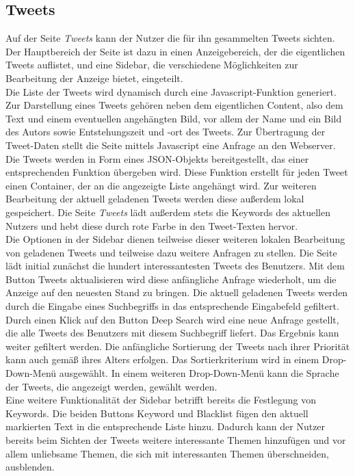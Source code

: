 \subsection{Tweets}
Auf der Seite \textit{Tweets} kann der Nutzer die für ihn gesammelten Tweets sichten. Der Hauptbereich der Seite ist dazu in einen Anzeigebereich, der die eigentlichen Tweets auflistet, und eine Sidebar, die verschiedene Möglichkeiten zur Bearbeitung der Anzeige bietet, eingeteilt. \\
Die Liste der Tweets wird dynamisch durch eine Javascript-Funktion generiert. Zur Darstellung eines Tweets gehören neben dem eigentlichen Content, also dem Text und einem eventuellen angehängten Bild, vor allem der Name und ein Bild des Autors sowie Entstehungszeit und -ort des Tweets. Zur Übertragung der Tweet-Daten stellt die Seite mittels Javascript eine Anfrage an den Webserver. Die Tweets werden in Form eines JSON-Objekts bereitgestellt, das einer entsprechenden Funktion übergeben wird. Diese Funktion erstellt für jeden Tweet einen Container, der an die angezeigte Liste angehängt wird. Zur weiteren Bearbeitung der aktuell geladenen Tweets werden diese außerdem lokal gespeichert. Die Seite \textit{Tweets} lädt außerdem stets die Keywords des aktuellen Nutzers und hebt diese durch rote Farbe in den Tweet-Texten hervor. \\
Die Optionen in der Sidebar dienen teilweise dieser weiteren lokalen Bearbeitung von geladenen Tweets und teilweise dazu weitere Anfragen zu stellen. Die Seite lädt initial zunächst die hundert interessantesten Tweets des Benutzers. Mit dem Button \glqq Tweets aktualisieren\grqq{} wird diese anfängliche Anfrage wiederholt, um die Anzeige auf den neuesten Stand zu bringen. Die aktuell geladenen Tweets werden durch die Eingabe eines Suchbegriffs in das entsprechende Eingabefeld gefiltert. Durch einen Klick auf den Button \glqq Deep Search\grqq{} wird eine neue Anfrage gestellt, die alle Tweets des Benutzers mit diesem Suchbegriff liefert. Das Ergebnis kann weiter gefiltert werden. Die anfängliche Sortierung der Tweets nach ihrer Priorität kann auch gemäß ihres Alters erfolgen. Das Sortierkriterium wird in einem Drop-Down-Menü ausgewählt. In einem weiteren Drop-Down-Menü kann die Sprache der Tweets, die angezeigt werden, gewählt werden. \\
Eine weitere Funktionalität der Sidebar betrifft bereits die Festlegung von Keywords. Die beiden Buttons \glqq Keyword\grqq{} und \glqq Blacklist\grqq{} fügen den aktuell markierten Text in die entsprechende Liste hinzu. Dadurch kann der Nutzer bereits beim Sichten der Tweets weitere interessante Themen hinzufügen und vor allem unliebsame Themen, die sich mit interessanten Themen überschneiden, ausblenden.
%
